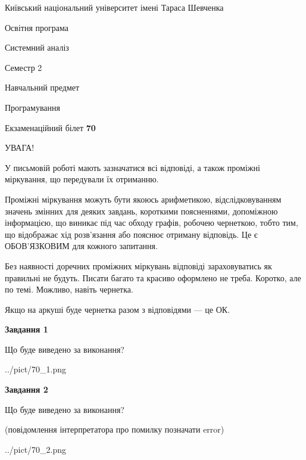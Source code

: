 \documentclass[12pt, ukrainian]{article}
\begin{document}
{{\begin {small}\par
{ \center  Київський національний університет імені Тараса Шевченка \par}
{\parbox {5 cm}{Освітня програма \hfill}{\parbox {7 cm}{Системний аналіз \hfill}}\parbox {6 cm}{\hfill Семестр 2}}\par
{\parbox {5 cm} {Навчальний предмет \hfill}\parbox {7 cm}{Програмування \hfill}\parbox {6cm}{\hfill}\par}\vspace{-7pt} \end{small}}{\center Екзаменаційний білет \No \textbf
{ 70 }\par}}
{
\begin {large}
УВАГА!

У письмовій роботі мають зазначатися всі відповіді, а також проміжні міркування, що передували їх отриманню.

Проміжні міркування можуть бути якоюсь арифметикою, відслідковуванням зна\-чень змінних для деяких завдань,
короткими поясненнями, допоміжною інформацією, що виникає під час обходу графів, робочею чернеткою,
тобто тим, що відображає хід розв’язання або пояснює отриману відповідь.
Це є ОБОВ’ЯЗКОВИМ для кожного запитання.

Без наявності доречних проміжних міркувань відповіді зараховуватись як правиль\-ні не будуть.
Писати багато та красиво оформлено не треба. Коротко, але по темі. Можли\-во, навіть чернетка.

Якщо на аркуші буде чернетка разом з відповідями --- це ОК.

\newpage

{\begin {center}\textbf{Завдання 1}\end {center}}\par
Що буде виведено за виконання?\par
\begin{center}
	{../pict/70_1.png}
\end{center}
\newpage

{\begin {center}\textbf{Завдання 2}\end {center}}\par
Що буде виведено за виконання?\par
 (повідомлення інтерпретатора про помилку позначати error)\par
\begin{center}
	{../pict/70_2.png}
\end{center}
\newpage


\end{large}}
\end{document}
